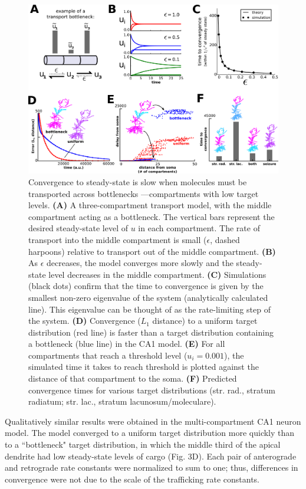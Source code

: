 \documentclass[10pt]{wlpeerj}
\begin{document}
\begin{figure}[!tb]
\begin{center}
\includegraphics[width=0.9\columnwidth]{03_convergence.png}
\caption{ Convergence to steady-state is slow when molecules must be transported across bottlenecks ---compartments with low target levels.
\textbf{(A)} A three-compartment transport model, with the middle compartment acting as a bottleneck. The vertical bars represent the desired steady-state level of $u$ in each compartment. The rate of transport into the middle compartment is small ($\epsilon$, dashed harpoons) relative to transport out of the middle compartment.
\textbf{(B)} As $\epsilon$ decreases, the model converges more slowly and the steady-state level decreases in the middle compartment.
\textbf{(C)} Simulations (black dots) confirm that the time to convergence is given by the smallest non-zero eigenvalue of the system (analytically calculated line). This eigenvalue can be thought of as the rate-limiting step of the system.
\textbf{(D)} Convergence ($L_1$ distance) to a uniform target distribution (red line) is faster than a target distribution containing a bottleneck (blue line) in the CA1 model.
\textbf{(E)} For all compartments that reach a threshold level ($u_i = 0.001$), the simulated time it takes to reach threshold is plotted against the distance of that compartment to the soma.
\textbf{(F)} Predicted convergence times for various target distributions (str. rad., stratum radiatum; str. lac., stratum lacunosum/moleculare).}
\end{center}
\end{figure}

Qualitatively similar results were obtained in the multi-compartment CA1 neuron model.
The model converged to a uniform target distribution more quickly than to a ``bottleneck" target distribution, in which the middle third of the apical dendrite had low steady-state levels of cargo (Fig. 3D).
Each pair of anterograde and retrograde rate constants were normalized to sum to one; thus, differences in convergence were not due to the scale of the trafficking rate constants.
\end{document}
